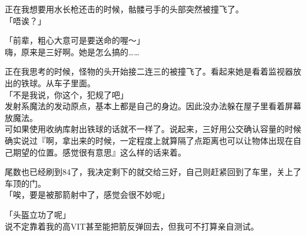 正在我想要用水长枪还击的时候，骷髅弓手的头部突然被撞飞了。\\

「唔诶？」

「前辈，粗心大意可是要送命的喔～」\\

嗨，原来是三好啊。她是怎么搞的……

正在我思考的时候，怪物的头开始接二连三的被撞飞了。看起来她是看着监视器放出的铁球。从车子里面。\\

「不是我说，你这个，犯规了吧」\\

发射系魔法的发动原点，基本上都是自己的身边。因此没办法躲在屋子里看着屏幕放魔法。\\

可如果使用收纳库射出铁球的话就不一样了。说起来，三好用公交确认容量的时候确实说过『啊，拿出来的时候，一定程度上就算隔了点距离也可以让物体出现在自己期望的位置。感觉很有意思』这么样的话来着。

尾数也已经刷到84了，我决定剩下的就交给三好，自己则赶紧回到了车里，关上了车顶的门。\\

「唉，要是被那箭射中了，感觉会很不妙呢」

「头盔立功了呢」\\

说不定靠着我的高VIT甚至能把箭反弹回去，但我可不打算亲自测试。

